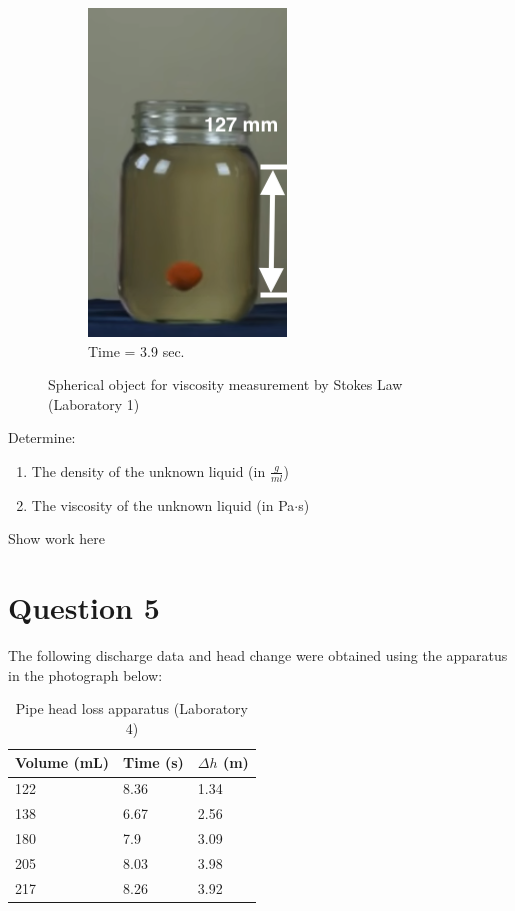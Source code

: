 \documentclass[12pt]{article}
\begin{document}
\begin{figure}[h!]
\begin{subfigure}{.3\textwidth}
  \label{fig:sub2}
\end{subfigure}
\begin{subfigure}{.3\textwidth}
  \centering
  \includegraphics[width=.4\linewidth]{end.png}
  \caption{Time = 3.9 sec.}
  \label{fig:sub2}
\end{subfigure}
\caption{Spherical object for viscosity measurement by Stokes Law (Laboratory 1)}
\label{fig:test}
\end{figure}
Determine:
\begin{enumerate}
\item The density of the unknown liquid (in $\frac{g}{ml}$)
\item The viscosity of the unknown liquid (in Pa$\cdot$s)
\end{enumerate}
\clearpage
Show work here
\clearpage
\section*{Question 5}
The following discharge data and head change were obtained using the apparatus in the photograph below:

\begin{table}[h!]
    \centering
    \caption{Pipe head loss apparatus (Laboratory 4)}
    \begin{tabular}{p{1in} p{1in} p{1in}}
    Volume (mL) & Time (s) & $\Delta h$ (m) \\
    \hline
    122&8.36&1.34\\
    138&6.67&2.56\\
    180&7.9&3.09\\
    205&8.03&3.98\\
    217&8.26&3.92\\
    \end{tabular}
    \label{tab:table1}
\end{table}
\end{document}
